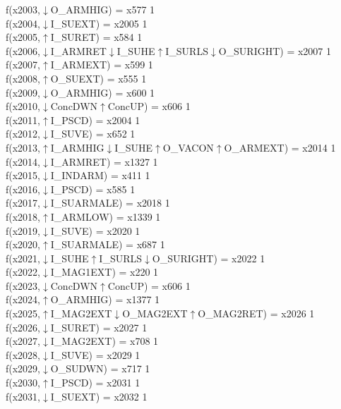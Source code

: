 f(x2003,$\downarrow$O\_ARMHIG) = x577 {1} \\
f(x2004,$\downarrow$I\_SUEXT) = x2005 {1} \\
f(x2005,$\uparrow$I\_SURET) = x584 {1} \\
f(x2006,$\downarrow$I\_ARMRET$\downarrow$I\_SUHE$\uparrow$I\_SURLS$\downarrow$O\_SURIGHT) = x2007 {1} \\
f(x2007,$\uparrow$I\_ARMEXT) = x599 {1} \\
f(x2008,$\uparrow$O\_SUEXT) = x555 {1} \\
f(x2009,$\downarrow$O\_ARMHIG) = x600 {1} \\
f(x2010,$\downarrow$ConcDWN$\uparrow$ConcUP) = x606 {1} \\
f(x2011,$\uparrow$I\_PSCD) = x2004 {1} \\
f(x2012,$\downarrow$I\_SUVE) = x652 {1} \\
f(x2013,$\uparrow$I\_ARMHIG$\downarrow$I\_SUHE$\uparrow$O\_VACON$\uparrow$O\_ARMEXT) = x2014 {1} \\
f(x2014,$\downarrow$I\_ARMRET) = x1327 {1} \\
f(x2015,$\downarrow$I\_INDARM) = x411 {1} \\
f(x2016,$\downarrow$I\_PSCD) = x585 {1} \\
f(x2017,$\downarrow$I\_SUARMALE) = x2018 {1} \\
f(x2018,$\uparrow$I\_ARMLOW) = x1339 {1} \\
f(x2019,$\downarrow$I\_SUVE) = x2020 {1} \\
f(x2020,$\uparrow$I\_SUARMALE) = x687 {1} \\
f(x2021,$\downarrow$I\_SUHE$\uparrow$I\_SURLS$\downarrow$O\_SURIGHT) = x2022 {1} \\
f(x2022,$\downarrow$I\_MAG1EXT) = x220 {1} \\
f(x2023,$\downarrow$ConcDWN$\uparrow$ConcUP) = x606 {1} \\
f(x2024,$\uparrow$O\_ARMHIG) = x1377 {1} \\
f(x2025,$\uparrow$I\_MAG2EXT$\downarrow$O\_MAG2EXT$\uparrow$O\_MAG2RET) = x2026 {1} \\
f(x2026,$\downarrow$I\_SURET) = x2027 {1} \\
f(x2027,$\downarrow$I\_MAG2EXT) = x708 {1} \\
f(x2028,$\downarrow$I\_SUVE) = x2029 {1} \\
f(x2029,$\downarrow$O\_SUDWN) = x717 {1} \\
f(x2030,$\uparrow$I\_PSCD) = x2031 {1} \\
f(x2031,$\downarrow$I\_SUEXT) = x2032 {1} \\
